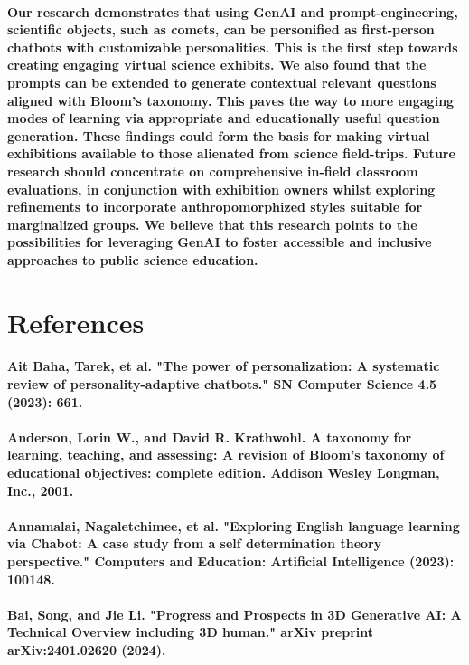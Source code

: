 \documentclass{article}
\begin{document}
\paragraph{Our research demonstrates that using GenAI and prompt-engineering, scientific objects, such as comets, can be personified as first-person chatbots with customizable personalities. This is the first step towards creating engaging virtual science exhibits. We also found that the prompts can be extended to generate contextual relevant questions aligned with Bloom’s taxonomy. This paves the way to more engaging modes of learning via appropriate and educationally useful question generation. These findings could form the basis for making virtual exhibitions available to those alienated from science field-trips. Future research should concentrate on comprehensive in-field classroom evaluations, in conjunction with exhibition owners whilst exploring refinements to incorporate anthropomorphized styles suitable for marginalized groups. We believe that this research points to the possibilities for leveraging GenAI to foster accessible and inclusive approaches to public science education.}

\newpage

\section*{References}

\paragraph{Ait Baha, Tarek, et al. "The power of personalization: A systematic review of personality-adaptive chatbots." SN Computer Science 4.5 (2023): 661.}
\paragraph{Anderson, Lorin W., and David R. Krathwohl. A taxonomy for learning, teaching, and assessing: A revision of Bloom's taxonomy of educational objectives: complete edition. Addison Wesley Longman, Inc., 2001.}
\paragraph{Annamalai, Nagaletchimee, et al. "Exploring English language learning via Chabot: A case study from a self determination theory perspective." Computers and Education: Artificial Intelligence (2023): 100148.}
\paragraph{Bai, Song, and Jie Li. "Progress and Prospects in 3D Generative AI: A Technical Overview including 3D human." arXiv preprint arXiv:2401.02620 (2024).}
\end{document}

